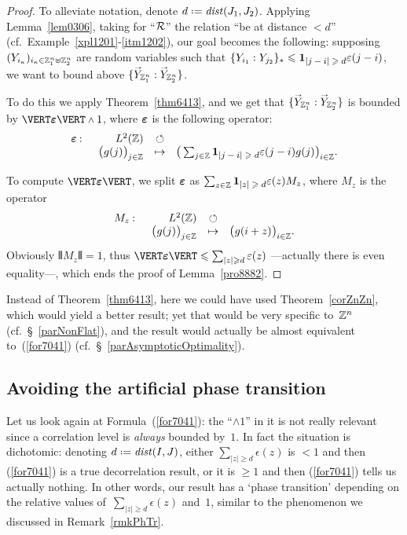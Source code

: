 \begin{proof}
To alleviate notation, denote $d \coloneqq \dist(J_1,J_2)$.
Applying Lemma~\ref{lem0306},
taking for ``$\mathcal{R}$'' the relation ``be at distance $<d$''
(cf.\ Example~\ref{xpl1201}-\ref{itm1202}),
our goal becomes the following:
supposing $(Y_{i_\kappa})_{i_\kappa\in\mathbb{Z}^n_1\uplus\mathbb{Z}^n_2}$ are random variables
such that $\{Y_{i_1}:Y_{j_2}\}_* \leq \1{|j-i|\geq d}\epsilon(j-i)$,
we want to bound above $\{\vec{Y}_{\ZZ^n_1}:\vec{Y}_{\ZZ^n_2}\}$.

To do this we apply Theorem~\ref{thm6413},
and we get that $\{\vec{Y}_{\ZZ^n_1}:\vec{Y}_{\ZZ^n_2}\}$ is bounded by
$\VERT \boldepsilon \VERT \wedge 1$,
where $\boldsymbol{\varepsilon}$ is the following operator:
%
\[ \begin{array}{rrcl} \boldepsilon \colon & L^2(\ZZ) & \circlearrowleft & \\
& \big(g(j)\big)_{j\in\ZZ} & \mapsto &
\big( \sum_{j\in\ZZ} \1{|j-i|\geq d} \epsilon(j-i) g(j) \big)_{i\in\ZZ} .
\end{array} \]

To compute $\VERT \boldepsilon \VERT$, we split $\boldsymbol{\varepsilon}$
as $\sum_{z\in\ZZ} \1{|z|\geq d} \epsilon(z) M_z$, where
$M_z$ is the operator
\[ \begin{array}{rrcl} M_z \colon & L^2(\ZZ) & \circlearrowleft & \\
& \big(g(j)\big)_{j\in\ZZ} & \mapsto &
\big( g(i+z) \big)_{i\in\ZZ} .\end{array} \]
%
Obviously $\VERT M_z \VERT = 1$,
thus $\VERT \boldepsilon \VERT \leq \sum_{|z|\geq d} \epsilon(z)$
—actually there is even equality\hbox{—,}
which ends the proof of Lemma~\ref{pro8882}.
\end{proof}

\begin{Rmk}
Instead of Theorem~\ref{thm6413}, here we could have used Theorem~\ref{corZnZn},
which would yield a better result;
yet that would be very specific to~$\mathbb{Z}^n$ (cf.\ \S~\ref{parNonFlat}),
and the result would actually be almost equivalent to~(\ref{for7041})
(cf.\ \S~\ref{parAsymptoticOptimality}).
\end{Rmk}


\subsection{Avoiding the artificial phase transition}%
\label{parAvoidingThePhaseTransitionForTheToyModel}

Let us look again at Formula~(\ref{for7041}):
the ``$\wedge 1$'' in it is not really relevant
since a correlation level is \emph{always} bounded by~$1$.
In fact the situation is di\-cho\-to\-mic:
denoting $d \coloneqq \dist(I,J)$, either $\sum_{|z|\geq d} \epsilon(z)$ is $<1$ and then
(\ref{for7041}) is a true decorrelation result,
or it is $\geq1$ and then (\ref{for7041}) tells us actually nothing.
In other words, our result has a `phase transition'
depending on the relative values of~$\sum_{|z|\geq d} \epsilon(z)$ and~$1$,
similar to the phenomenon we discussed in Remark~\ref{rmkPhTr}.

